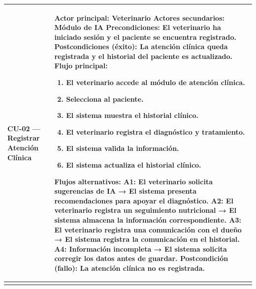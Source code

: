 \documentclass[
]{article}
\newcounter{none} %
\begin{document}
{\def\LTcaptype{none} %
\begin{longtable}[]{|
  >{\raggedright\arraybackslash}p{}|
  >{\raggedright\arraybackslash}p{}|}
\hline
\begin{minipage}[b]{\linewidth}\raggedright
\textbf{CU-02 --- Registrar Atención Clínica}
\end{minipage} & \begin{minipage}[b]{\linewidth}\raggedright
\textbf{Actor principal:} Veterinario \textbf{Actores secundarios:} Módulo de IA \textbf{Precondiciones:} El
veterinario ha iniciado sesión y el paciente se encuentra registrado. \textbf{Postcondiciones (éxito):} La atención clínica queda registrada y
el historial del paciente es actualizado. \textbf{Flujo principal:}

\begin{enumerate}
\def\labelenumi{\arabic{enumi}.}
\item
  El veterinario accede al módulo de atención clínica.
\item
  Selecciona al paciente.
\item
  El sistema muestra el historial clínico.
\item
  El veterinario registra el diagnóstico y tratamiento.
\item
  El sistema valida la información.
\item
  El sistema actualiza el historial clínico.
\end{enumerate}

\textbf{Flujos alternativos:} A1: El veterinario solicita sugerencias de IA → El
sistema presenta recomendaciones para apoyar el diagnóstico.
A2: El veterinario registra un seguimiento nutricional → El sistema almacena la información correspondiente. A3: El veterinario registra una comunicación con el dueño → El sistema
registra la comunicación en el historial. A4: Información incompleta → El sistema solicita corregir los datos
antes de guardar. \textbf{Postcondición (fallo):} La atención clínica no es registrada.
\end{minipage} \\
\hline
\endhead
\hline
\endlastfoot
\end{longtable}
}
\end{document}
